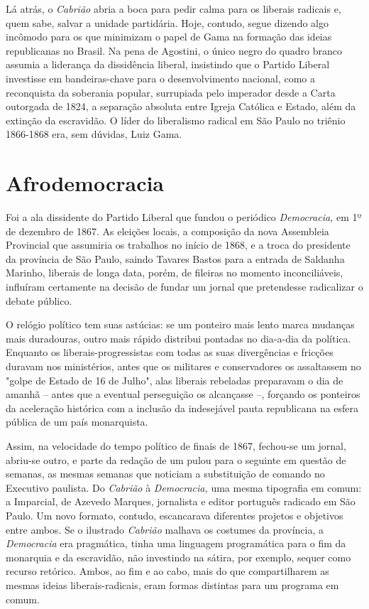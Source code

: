 Lá atrás, o \emph{Cabrião} abria a boca para pedir calma para os
liberais radicais e, quem sabe, salvar a unidade partidária. Hoje,
contudo, segue dizendo algo incômodo para os que minimizam o papel de
Gama na formação das ideias republicanas no Brasil. Na pena de Agostini,
o único negro do quadro branco assumia a liderança da dissidência
liberal, insistindo que o Partido Liberal investisse em bandeiras-chave
para o desenvolvimento nacional, como a reconquista da soberania
popular, surrupiada pelo imperador desde a Carta outorgada de 1824, a
separação absoluta entre Igreja Católica e Estado, além da extinção da
escravidão. O líder do liberalismo radical em São Paulo no triênio
1866-1868 era, sem dúvidas, Luiz Gama.

\section{Afrodemocracia}

Foi a ala dissidente do Partido Liberal que fundou o periódico
\emph{Democracia,} em 1º de dezembro de 1867. As eleições locais, a
composição da nova Assembleia Provincial que assumiria os trabalhos no
início de 1868, e a troca do presidente da província de São Paulo,
saindo Tavares Bastos para a entrada de Saldanha Marinho, liberais de
longa data, porém, de fileiras no momento inconciliáveis, influíram
certamente na decisão de fundar um jornal que pretendesse radicalizar o
debate público.

O relógio político tem suas astúcias: se um ponteiro mais lento marca
mudanças mais duradouras, outro mais rápido distribui pontadas no
dia-a-dia da política. Enquanto os liberais-progressistas com todas as
suas divergências e fricções duravam nos ministérios, antes que os
militares e conservadores os assaltassem no "golpe de Estado de 16 de
Julho", alas liberais rebeladas preparavam o dia de amanhã -- antes que
a eventual perseguição os alcançasse --, forçando os ponteiros da
aceleração histórica com a inclusão da indesejável pauta republicana na
esfera pública de um país monarquista.

Assim, na velocidade do tempo político de finais de 1867, fechou-se um
jornal, abriu-se outro, e parte da redação de um pulou para o seguinte
em questão de semanas, as mesmas semanas que noticiam a substituição de
comando no Executivo paulista. Do \emph{Cabrião} à \emph{Democracia,}
uma mesma tipografia em comum: a Imparcial, de Azevedo Marques,
jornalista e editor português radicado em São Paulo. Um novo formato,
contudo, escancarava diferentes projetos e objetivos entre ambos. Se o
ilustrado \emph{Cabrião} malhava os costumes da província, a
\emph{Democracia} era pragmática, tinha uma linguagem programática para
o fim da monarquia e da escravidão, não investindo na sátira, por
exemplo, sequer como recurso retórico. Ambos, ao fim e ao cabo, mais do
que compartilharem as mesmas ideias liberais-radicais, eram formas
distintas para um programa em comum.

